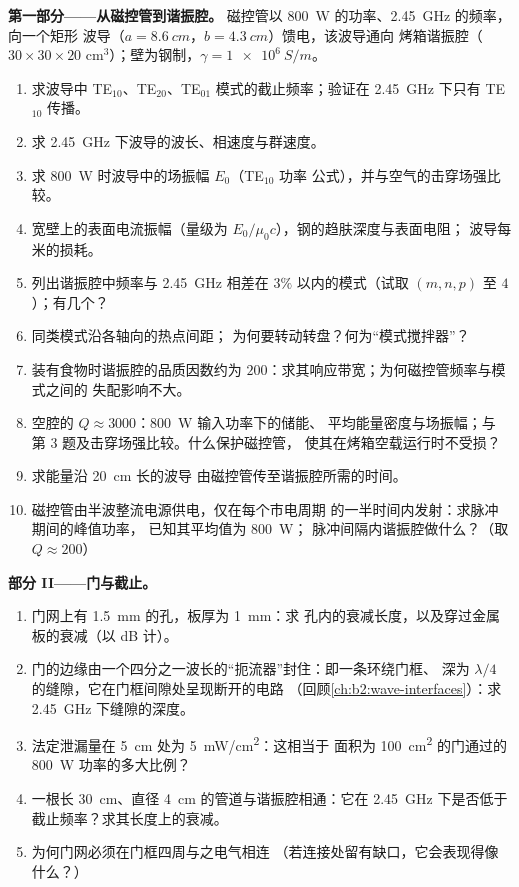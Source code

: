 \begin{problem}
\label{pb:b2:guided-waves:1}

\medskip
\noindent\textbf{第一部分——从磁控管到谐振腔。}
磁控管以 \qty{800}{W} 的功率、\qty{2.45}{GHz} 的频率，向一个矩形
波导（$a = \qty{8.6}{cm}$，$b = \qty{4.3}{cm}$）馈电，该波导通向
烤箱谐振腔（$30 \times 30 \times 20$ cm$^3$）；壁为钢制，$\gamma = \qty{1e6}{S/m}$。
\begin{enumerate}
  \item 求波导中 TE$_{10}$、TE$_{20}$、TE$_{01}$
        模式的截止频率；验证在 \qty{2.45}{GHz} 下只有 TE$_{10}$ 传播。
  \item 求 \qty{2.45}{GHz} 下波导的波长、相速度与群速度。
  \item 求 \qty{800}{W} 时波导中的场振幅 $E_0$（TE$_{10}$ 功率
        公式），并与空气的击穿场强比较。
  \item 宽壁上的表面电流振幅（量级为
        $E_0/\mu_0c$），钢的趋肤深度与表面电阻；
        波导每米的损耗。
  \item 列出谐振腔中频率与
        \qty{2.45}{GHz} 相差在 $3\%$ 以内的模式（试取 $(m, n, p)$ 至 $4$）；有几个？
  \item 同类模式沿各轴向的热点间距；
        为何要转动转盘？何为“模式搅拌器”？
  \item 装有食物时谐振腔的品质因数约为
        $200$：求其响应带宽；为何磁控管频率与模式之间的
        失配影响不大。
  \item 空腔的 $Q \approx 3000$：\qty{800}{W} 输入功率下的储能、
        平均能量密度与场振幅；与
        第 3 题及击穿场强比较。什么保护磁控管，
        使其在烤箱空载运行时不受损？
  \item 求能量沿 \qty{20}{cm} 长的波导
        由磁控管传至谐振腔所需的时间。
  \item 磁控管由半波整流电源供电，仅在每个市电周期
        的一半时间内发射：求脉冲期间的峰值功率，
        已知其平均值为 \qty{800}{W}；
        脉冲间隔内谐振腔做什么？（取 $Q \approx 200$）
\end{enumerate}

\medskip
\noindent\textbf{部分 II——门与截止。}
\begin{enumerate}[resume]
  \item 门网上有 \qty{1.5}{mm} 的孔，板厚为 \qty{1}{mm}：求
        孔内的衰减长度，以及穿过金属板的衰减（以 dB 计）。
  \item 门的边缘由一个四分之一波长的“扼流器”封住：即一条环绕门框、
        深为 $\lambda/4$ 的缝隙，它在门框间隙处呈现断开的电路
        （回顾\cref{ch:b2:wave-interfaces}）：求
        \qty{2.45}{GHz} 下缝隙的深度。
  \item 法定泄漏量在 \qty{5}{cm} 处为 \qty{5}{mW/cm^2}：这相当于
        面积为 \qty{100}{cm^2} 的门通过的 \qty{800}{W} 功率的多大比例？
  \item 一根长 \qty{30}{cm}、直径 \qty{4}{cm} 的管道与谐振腔相通：它在
        \qty{2.45}{GHz} 下是否低于截止频率？求其长度上的衰减。
  \item 为何门网必须在门框四周与之电气相连
        （若连接处留有缺口，它会表现得像什么？）
\end{enumerate}


\end{problem}
